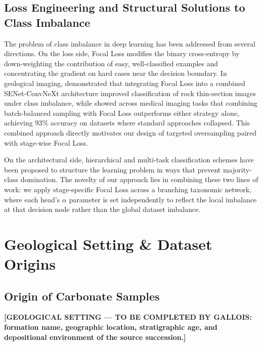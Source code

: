 \documentclass[a4paper,fleqn]{cas-dc}
\begin{document}
\subsection{Loss Engineering and Structural Solutions to Class Imbalance}
The problem of class imbalance in deep learning has been addressed from several directions. On the loss side, Focal Loss \citep{lin2017focal} modifies the binary cross-entropy by down-weighting the contribution of easy, well-classified examples and concentrating the gradient on hard cases near the decision boundary. In geological imaging, \citet{dong2025} demonstrated that integrating Focal Loss into a combined SENet-ConvNeXt architecture improved classification of rock thin-section images under class imbalance, while \citet{singh2023} showed across medical imaging tasks that combining batch-balanced sampling with Focal Loss outperforms either strategy alone, achieving 93\% accuracy on datasets where standard approaches collapsed. This combined approach directly motivates our design of targeted oversampling paired with stage-wise Focal Loss.

On the architectural side, hierarchical and multi-task classification schemes have been proposed to structure the learning problem in ways that prevent majority-class domination. The novelty of our approach lies in combining these two lines of work: we apply stage-specific Focal Loss across a branching taxonomic network, where each head's $\alpha$ parameter is set independently to reflect the local imbalance at that decision node rather than the global dataset imbalance.

\section{Geological Setting \& Dataset Origins}

\subsection{Origin of Carbonate Samples}
\textbf{[GEOLOGICAL SETTING --- TO BE COMPLETED BY GALLOIS: formation name, geographic location, stratigraphic age, and depositional environment of the source succession.]}
\end{document}
